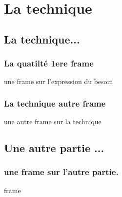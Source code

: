 \section{La technique}
\subsection{La technique...}
\begin{frame}
  \frametitle{\color{white} La quatilté 1ere frame}
  une frame sur l'expression du besoin
\end{frame}
\begin{frame}
  \frametitle{\color{white} La technique autre frame}
  une autre frame sur la technique
\end{frame}
\subsection{Une autre partie ...}
\begin{frame}
  \frametitle{\color{white} une frame sur l'autre partie.}
  frame
\end{frame}
